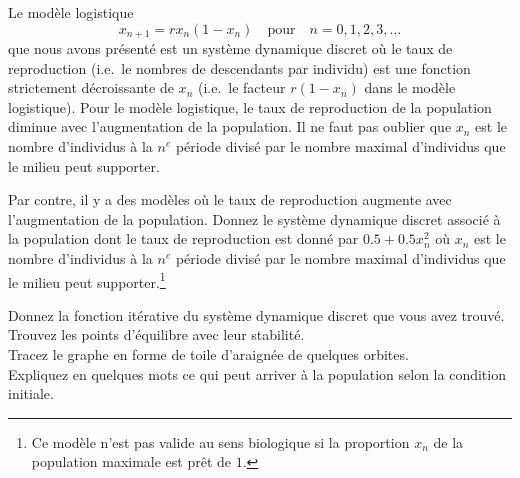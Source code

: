 \begin{question}[\life]
Le modèle logistique
\[
x_{n+1} = r x_n(1-x_n) \quad \text{pour} \quad n=0, 1, 2, 3, \ldots
\]
que nous avons présenté est un système dynamique discret où le taux de
reproduction (i.e.\ le nombres de descendants par individu) est une fonction
strictement décroissante de $x_n$ (i.e.\ le facteur $r(1-x_n)$ dans le
modèle logistique).  Pour le modèle logistique, le taux de
reproduction de la population diminue avec l'augmentation de la
population.  Il ne faut pas oublier que $x_n$ est le nombre
d'individus à la $n^e$ période divisé par le nombre maximal
d'individus que le milieu peut supporter.

Par contre, il y a des modèles où le taux de reproduction augmente avec
l'augmentation de la population.  Donnez le système dynamique discret associé
à la population dont le taux de reproduction est donné par $0.5+0.5x_n^2$ où
$x_n$ est le nombre d'individus à la $n^e$ période divisé par le nombre
maximal d'individus que le milieu peut supporter.\footnote{Ce modèle
n'est pas valide au sens biologique si la proportion $x_n$ de la
population maximale est prêt de $1$.}

 Donnez la fonction itérative du système dynamique discret que
vous avez trouvé.\\
 Trouvez les points d'équilibre avec leur stabilité.\\
 Tracez le graphe en forme de toile d'araignée de quelques
orbites.\\
 Expliquez en quelques mots ce qui peut arriver à la population
selon la condition initiale.
\label{6Q113}
\end{question}

